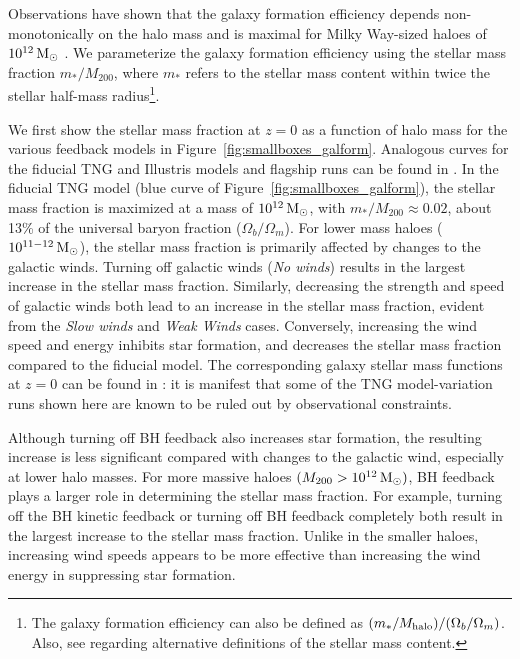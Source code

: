 \documentclass[fleqn,usenatbib]{mnras}
\def\msun{\,\rm M_{\odot}}
\begin{document}
Observations have shown that the galaxy formation efficiency depends non-monotonically on the halo mass and is maximal for Milky Way-sized haloes of $10^{12}\msun$ \citep[e.g.][]{Conroy09v696, Leauthaud12v744}.
We parameterize the galaxy formation efficiency using the stellar mass fraction $m_*/M_{200}$,  where $m_*$ refers to the stellar mass content within twice the stellar half-mass radius\footnote{The galaxy formation efficiency can also be defined as $(m_*/M_{\rm halo}) / (\Omega_b/\Omega_m)$. Also, see \cite{Pillepich18v475} regarding alternative definitions of the stellar mass content.}.

We first show the stellar mass fraction at $z=0$ as a function of halo mass for the various feedback models in Figure~\ref{fig:smallboxes_galform}. 
Analogous curves for the fiducial TNG and Illustris models and flagship runs can be found in \citealt{Pillepich18v473, Pillepich18v475}.
In the fiducial TNG model (blue curve of Figure~\ref{fig:smallboxes_galform}), the stellar mass fraction is maximized at a mass of $10^{12} \msun$, with $m_*/M_{200} \approx 0.02$, about 13\% of the universal baryon fraction ($\Omega_b/\Omega_m$).
For lower mass haloes ($10^{11-12} \msun$), the stellar mass fraction is primarily affected by changes to the galactic winds.
Turning off galactic winds (\emph{No winds}) results in the largest increase in the stellar mass fraction.
Similarly, decreasing the strength and speed of galactic winds both lead to an increase in the stellar mass fraction, evident from the \emph{Slow winds} and \emph{Weak Winds} cases.
Conversely, increasing the wind speed and energy inhibits star formation, and decreases the stellar mass fraction compared to the fiducial model. The corresponding galaxy stellar mass functions at $z=0$ can be found in \citealt{Pillepich18v473}: it is manifest that some of the TNG model-variation runs shown here are known to be ruled out by observational constraints.

Although turning off BH feedback also increases star formation, the resulting increase is less significant compared with changes to the galactic wind, especially at lower halo masses. 
%
For more massive haloes $(M_{200} >10^{12} \msun)$, BH feedback plays a larger role in determining the stellar mass fraction.
For example, turning off the BH kinetic feedback or turning off BH feedback completely both result in the largest increase to the stellar mass fraction.
Unlike in the smaller haloes, increasing wind speeds appears to be more effective than increasing the wind energy in suppressing star formation.
\end{document}
